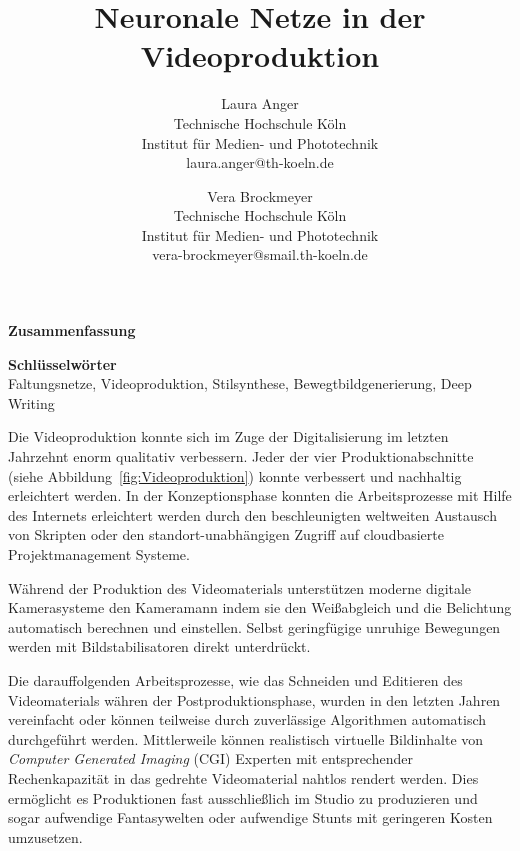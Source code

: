 \documentclass[times, 12pt,twocolumn]{article}
\begin{document}
\title{Neuronale Netze in der Videoproduktion}

\author{Laura Anger\\
Technische Hochschule K\"oln \\ Institut f\"ur Medien- und Phototechnik \\  laura.anger@th-koeln.de \\
\and
Vera Brockmeyer\\
Technische Hochschule K\"oln \\ Institut f\"ur Medien- und Phototechnik \\ vera-brockmeyer@smail.th-koeln.de \\
}

\maketitle
\thispagestyle{empty}


\large{\textbf{Zusammenfassung}}\\ \small %
{} 

\large{\textbf{Schl\"usselw\"orter}}\\ \small %
 Faltungsnetze, Videoproduktion, Stilsynthese, Bewegtbildgenerierung, Deep Writing


 \label{sec:Einleitung}
Die Videoproduktion konnte sich im Zuge der Digitalisierung im letzten Jahrzehnt enorm qualitativ verbessern. Jeder der vier Produktionabschnitte (siehe Abbildung~\ref{fig:Videoproduktion}) konnte verbessert und nachhaltig erleichtert werden. In der Konzeptionsphase konnten die Arbeitsprozesse mit Hilfe des Internets erleichtert werden durch den beschleunigten weltweiten Austausch von Skripten oder den standort-unabhängigen Zugriff auf cloudbasierte Projektmanagement Systeme.

Während der Produktion des Videomaterials unterstützen moderne digitale Kamerasysteme den Kameramann indem sie den Weißabgleich und die Belichtung automatisch berechnen und einstellen. Selbst geringfügige unruhige Bewegungen werden mit Bildstabilisatoren direkt unterdrückt.  

Die darauffolgenden Arbeitsprozesse, wie das Schneiden und Editieren des Videomaterials währen der Postproduktionsphase, wurden in den letzten Jahren vereinfacht oder können teilweise durch zuverlässige Algorithmen automatisch durchgeführt werden. Mittlerweile können realistisch virtuelle Bildinhalte von \textit{Computer Generated Imaging} (CGI) Experten mit entsprechender Rechenkapazität in das gedrehte Videomaterial nahtlos rendert werden. Dies ermöglicht es Produktionen fast ausschließlich im Studio zu produzieren und sogar aufwendige Fantasywelten oder aufwendige Stunts mit geringeren Kosten umzusetzen.
\end{document}
